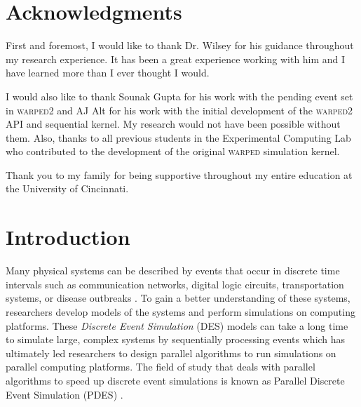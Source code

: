 \documentclass[11pt]{book}
\begin{document}


\chapter*{Acknowledgments}

First and foremost, I would like to thank Dr. Wilsey for his guidance throughout my research
experience. It has been a great experience working with him and I have learned more than I
ever thought I would.

I would also like to thank Sounak Gupta for his work with the pending event set in
\textsc{warped2} and AJ Alt for his work with the initial development of the
\textsc{warped2} API and sequential kernel.  My research would not have been possible
without them.  Also, thanks to all previous students in the Experimental Computing Lab who
contributed to the development of the original \textsc{warped} simulation kernel.

Thank you to my family for being supportive throughout my entire education at the
University of Cincinnati.

\tableofcontents    \markright{ }
\listoffigures      \markright{ }
\listoftables       \markright{ }
\listofalgorithms   \markright{ }
\lstlistoflistings  \markright{ }

\clearpage
{} \setcounter{page}{1}

\chapter{Introduction}\label{intro}

Many physical systems can be described by events that occur in discrete time intervals
such as communication networks, digital logic circuits, transportation systems, or disease
outbreaks \cite{law-XX}.  To gain a better understanding of these systems, researchers
develop models of the systems and perform simulations on computing platforms.  These
\emph{Discrete Event Simulation} (DES) models can take a long time to simulate large,
complex systems by sequentially processing events which has ultimately led researchers to
design parallel algorithms to run simulations on parallel computing platforms.  The field
of study that deals with parallel algorithms to speed up discrete event simulations is
known as Parallel Discrete Event Simulation (PDES) \cite{fujimoto-90,fujimoto-00}.
\end{document}
